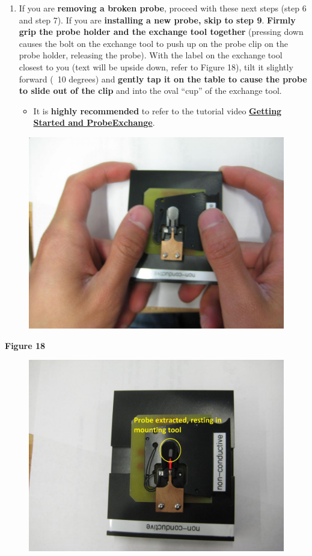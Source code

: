\documentclass{../lab}
\begin{document}
\begin{enumerate}
    \item If you are \textbf{removing a broken probe}, proceed with these next steps (step 6 and step 7).  If you are\textbf{ installing a new probe, skip to step 9}. \textbf{Firmly grip the probe holder and the exchange tool together} (pressing down causes the bolt on the exchange tool to push up on the probe clip on the probe holder, releasing the probe).  With the label on the exchange tool closest to you (text will be upside down, refer to Figure 18), tilt it slightly forward (~10 degrees) and \textbf{gently tap it on the table to cause the probe to slide out of the clip} and into the oval ``cup'' of the exchange tool.
    \begin{itemize}
        \item It is \textbf{highly recommended} to refer to the tutorial video \href{http://experimentationlab.berkeley.edu/sites/default/files/gettingstarted\_final2.mp4}{\textbf{Getting Started and Probe}}\href{http://experimentationlab.berkeley.edu/sites/default/files/gettingstarted\_final2.mp4}{\textbf{Exchange}}.

    \end{itemize}

\end{enumerate}


\begin{figure}[h]
    \centering
    \href{http://dev-physicsadv.pantheon.berkeley.edu/sites/default/files/AFMImages/18.JPG}{\includegraphics[width=0.5\linewidth]{images/18.JPG}}
    \caption{}
    \label{fig:18}
\end{figure}

\textbf{Figure 18}


\begin{figure}[h]
    \centering
    \href{http://dev-physicsadv.pantheon.berkeley.edu/sites/default/files/AFMImages/19.JPG}{\includegraphics[width=0.5\linewidth]{images/19.JPG}}
    \caption{}
    \label{fig:19}
\end{figure}
\end{document}
